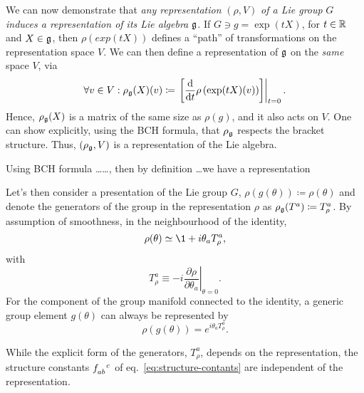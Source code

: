 We can now demonstrate that \emph{any representation} $(\rho, V)$ \emph{of a Lie group} $G$ \emph{induces a representation of its Lie algebra} $\mathfrak{g}$. If $G \ni g = \exp(tX)$, for $t\in \mathbb{R}$ and $X \in \mathfrak{g}$, then $\rho \left(exp(tX)\right)$ defines a “path” of transformations on the representation space $V$. We can then define a representation of $\mathfrak{g}$ on the \emph{same} space $V$, via
\begin{equation}
    \forall v \in V : \rho_{\mathfrak{g}}(X)(v) \coloneq \left. \left[ \frac{\mathop{}\!\mathrm{d}}{\mathop{}\!\mathrm{d} t} \rho \left( \exp(tX)(v) \right) \right] \right|_{t=0} .
\end{equation}
Hence, $\rho_{\mathfrak{g}}(X)$ is a matrix of the same size as $\rho(g)$, and it also acts on $V$. One can show explicitly, using the BCH formula, that $\rho_{\mathfrak{g}}$ respects the bracket structure. Thus, $(\rho_{\mathfrak{g}}, V)$ is a representation of the Lie algebra.
\begin{mdframed}
\begin{innerproof}
    \color{red} Using BCH formula \dots \dots, then by definition \dots we have a representation \color{black}
\end{innerproof}
\end{mdframed}

Let's then consider a presentation of the Lie group $G$, $\rho(g(\theta)) \coloneq \rho(\theta)$ and denote the generators of the group in the representation $\rho$ as $\rho_{\mathfrak{g}} (T^a) \coloneq T^a_\rho$. By assumption of smoothness, in the neighbourhood of the identity,
\begin{equation}\label{eq:generators-rep}
    \rho(\theta) \simeq \1 + i \theta_a T_\rho^a,
\end{equation}
with 
\begin{equation}
    T_\rho^a \equiv \left. -i \frac{\partial \rho}{\partial \theta_a}\right|_{\theta=0}.
\end{equation}
For the component of the group manifold connected to the identity, a generic group element $g(\theta)$ can always be represented by
\begin{equation}\label{eq:exp-map-rep}
    \rho(g(\theta)) = e^{i \theta_a T_\rho^a} .
\end{equation}

\begin{remark}
    While the explicit form of the generators, $T_\rho^a$, depends on the representation, the structure constants $\tensor{f}{_a_b^c}$ of eq.~\eqref{eq:structure-contants} are independent of the representation.
\end{remark}

